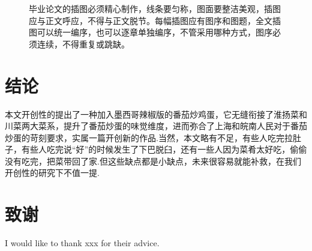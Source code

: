 \begin{figure}[htb]
    \centering
    \caption{毕业论文的插图必须精心制作，线条要匀称，图面要整洁美观，插图应与正文呼应，不得与正文脱节。每幅插图应有图序和图题，全文插图可以统一编序，也可以逐章单独编序，不管采用哪种方式，图序必须连续，不得重复或跳缺。}
    \label{fig:1}
\end{figure}




\clearpage
\section{结论}
本文开创性的提出了一种加入墨西哥辣椒版的番茄炒鸡蛋，它无缝衔接了淮扬菜和川菜两大菜系，提升了番茄炒蛋的味觉维度，进而弥合了上海和皖南人民对于番茄炒蛋的苛刻要求，实属一篇开创新的作品.当然，本文略有不足，有些人吃完拉肚子，有些人吃完说“好”的时候发生了下巴脱臼，还有一些人因为菜肴太好吃，偷偷没有吃完，把菜带回了家.但这些缺点都是小缺点，未来很容易就能补救，在我们开创性的研究下不值一提.



\clearpage




\clearpage
\section*{致谢}
I would like to thank xxx for their advice.







